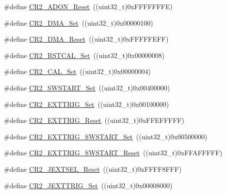 \begin{DoxyCompactItemize}
\item 
\#define \hyperlink{group___a_d_c___private___defines_gaa3eb5d77998387159508a57d7e09f459}{C\+R2\+\_\+\+A\+D\+O\+N\+\_\+\+Reset}~((uint32\+\_\+t)0x\+F\+F\+F\+F\+F\+F\+F\+E)
\item 
\#define \hyperlink{group___a_d_c___private___defines_ga7fa8ba27f5b249dd7cb0b6e53a25d6e2}{C\+R2\+\_\+\+D\+M\+A\+\_\+\+Set}~((uint32\+\_\+t)0x00000100)
\item 
\#define \hyperlink{group___a_d_c___private___defines_ga8e674886185af86bc17d9266ddbdca7c}{C\+R2\+\_\+\+D\+M\+A\+\_\+\+Reset}~((uint32\+\_\+t)0x\+F\+F\+F\+F\+F\+E\+F\+F)
\item 
\#define \hyperlink{group___a_d_c___private___defines_gaf256d4606fbe82d7e4cdc8d177653b53}{C\+R2\+\_\+\+R\+S\+T\+C\+A\+L\+\_\+\+Set}~((uint32\+\_\+t)0x00000008)
\item 
\#define \hyperlink{group___a_d_c___private___defines_ga6705aae168367a2d961e64dd9137ae3a}{C\+R2\+\_\+\+C\+A\+L\+\_\+\+Set}~((uint32\+\_\+t)0x00000004)
\item 
\#define \hyperlink{group___a_d_c___private___defines_gac40733c6a8918c16cd52fcade75a6de6}{C\+R2\+\_\+\+S\+W\+S\+T\+A\+R\+T\+\_\+\+Set}~((uint32\+\_\+t)0x00400000)
\item 
\#define \hyperlink{group___a_d_c___private___defines_gaf39824995dbcbabf76697cd7116352d6}{C\+R2\+\_\+\+E\+X\+T\+T\+R\+I\+G\+\_\+\+Set}~((uint32\+\_\+t)0x00100000)
\item 
\#define \hyperlink{group___a_d_c___private___defines_ga8a96cb9aac77bab199f3dff54da230a6}{C\+R2\+\_\+\+E\+X\+T\+T\+R\+I\+G\+\_\+\+Reset}~((uint32\+\_\+t)0x\+F\+F\+E\+F\+F\+F\+F\+F)
\item 
\#define \hyperlink{group___a_d_c___private___defines_gad9bed838631a650428d2318694a66094}{C\+R2\+\_\+\+E\+X\+T\+T\+R\+I\+G\+\_\+\+S\+W\+S\+T\+A\+R\+T\+\_\+\+Set}~((uint32\+\_\+t)0x00500000)
\item 
\#define \hyperlink{group___a_d_c___private___defines_gad0a6e5cf09868318178434340ade2fe1}{C\+R2\+\_\+\+E\+X\+T\+T\+R\+I\+G\+\_\+\+S\+W\+S\+T\+A\+R\+T\+\_\+\+Reset}~((uint32\+\_\+t)0x\+F\+F\+A\+F\+F\+F\+F\+F)
\item 
\#define \hyperlink{group___a_d_c___private___defines_gafa78c11893aa39ad2c0117414ae1704d}{C\+R2\+\_\+\+J\+E\+X\+T\+S\+E\+L\+\_\+\+Reset}~((uint32\+\_\+t)0x\+F\+F\+F\+F8\+F\+F\+F)
\item 
\#define \hyperlink{group___a_d_c___private___defines_ga20a54958799c567e9efaa0635aa18a99}{C\+R2\+\_\+\+J\+E\+X\+T\+T\+R\+I\+G\+\_\+\+Set}~((uint32\+\_\+t)0x00008000)

\end{DoxyCompactItemize}
